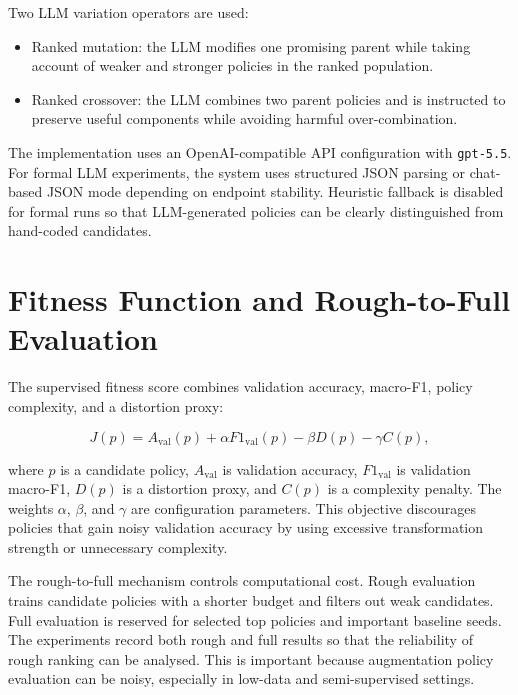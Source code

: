 \documentclass[12pt,a4paper]{report}
\begin{document}
Two LLM variation operators are used:

\begin{itemize}[leftmargin=*]
    \item Ranked mutation: the LLM modifies one promising parent while taking account of weaker and stronger policies in the ranked population.
    \item Ranked crossover: the LLM combines two parent policies and is instructed to preserve useful components while avoiding harmful over-combination.
\end{itemize}

The implementation uses an OpenAI-compatible API configuration with \texttt{gpt-5.5}. For formal LLM experiments, the system uses structured JSON parsing or chat-based JSON mode depending on endpoint stability. Heuristic fallback is disabled for formal runs so that LLM-generated policies can be clearly distinguished from hand-coded candidates.

\section{Fitness Function and Rough-to-Full Evaluation}

The supervised fitness score combines validation accuracy, macro-F1, policy complexity, and a distortion proxy:

\begin{equation}
J(p) = A_{\mathrm{val}}(p) + \alpha F1_{\mathrm{val}}(p) - \beta D(p) - \gamma C(p),
\end{equation}

where $p$ is a candidate policy, $A_{\mathrm{val}}$ is validation accuracy, $F1_{\mathrm{val}}$ is validation macro-F1, $D(p)$ is a distortion proxy, and $C(p)$ is a complexity penalty. The weights $\alpha$, $\beta$, and $\gamma$ are configuration parameters. This objective discourages policies that gain noisy validation accuracy by using excessive transformation strength or unnecessary complexity.

The rough-to-full mechanism controls computational cost. Rough evaluation trains candidate policies with a shorter budget and filters out weak candidates. Full evaluation is reserved for selected top policies and important baseline seeds. The experiments record both rough and full results so that the reliability of rough ranking can be analysed. This is important because augmentation policy evaluation can be noisy, especially in low-data and semi-supervised settings.
\end{document}
